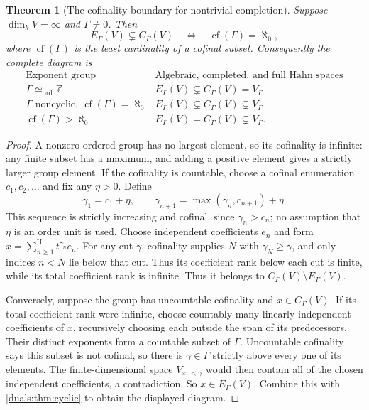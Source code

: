 \documentclass[11pt,letterpaper]{article}
\numberwithin{equation}{section}
\newtheorem{theorem}{Theorem}[section]
\theoremstyle{definition}
\theoremstyle{remark}
\newcommand{\Z}{\mathbb Z}
\newcommand{\sH}{\mathop{\sum}\nolimits^{\mathrm H}}
\begin{document}
\begin{theorem}[The cofinality boundary for nontrivial completion]
\label{duals:thm:cofinality-completion}
Suppose $\dim_kV=\infty$ and $\Gamma\ne0$. Then
\[
 E_\Gamma(V)\subsetneq C_\Gamma(V)
 \quad\Longleftrightarrow\quad \operatorname{cf}(\Gamma)=\aleph_0,
\]
where $\operatorname{cf}(\Gamma)$ is the least cardinality of a cofinal
subset. Consequently the complete diagram is
\[
 \begin{array}{c|c}
 \text{Exponent group}&\text{Algebraic, completed, and full Hahn spaces}\\ \hline
 \Gamma\simeq_{\mathrm{ord}}\Z&E_\Gamma(V)\subsetneq C_\Gamma(V)=V_\Gamma\\
 \Gamma\text{ noncyclic},\ \operatorname{cf}(\Gamma)=\aleph_0
 &E_\Gamma(V)\subsetneq C_\Gamma(V)\subsetneq V_\Gamma\\
 \operatorname{cf}(\Gamma)>\aleph_0&E_\Gamma(V)=C_\Gamma(V)\subsetneq V_\Gamma.
 \end{array}
\]
\end{theorem}
\begin{proof}
A nonzero ordered group has no largest element, so its cofinality is
infinite: any finite subset has a maximum, and adding a positive element
gives a strictly larger group element. If the cofinality is countable,
choose a cofinal enumeration $c_1,c_2,\ldots$ and fix any $\eta>0$.
Define
\[
 \gamma_1=c_1+\eta,\qquad
 \gamma_{n+1}=\max(\gamma_n,c_{n+1})+\eta.
\]
This sequence is strictly increasing and cofinal, since $\gamma_n>c_n$;
no assumption that $\eta$ is an order unit is used. Choose independent
coefficients $e_n$ and form $x=\sH_{n\ge1}t^{\gamma_n}e_n$.
For any cut $\gamma$, cofinality supplies $N$ with $\gamma_N\ge\gamma$,
and only indices $n<N$ lie below that cut. Thus its coefficient rank
below each cut is finite, while its total coefficient rank is infinite. Thus it belongs to
$C_\Gamma(V)\setminus E_\Gamma(V)$.

Conversely, suppose the group has uncountable cofinality and
$x\in C_\Gamma(V)$. If its total coefficient rank were infinite,
choose countably many linearly independent coefficients of $x$,
recursively choosing each outside the span of its predecessors.
Their distinct exponents form a countable subset of $\Gamma$.
Uncountable cofinality says this subset is not cofinal, so there is
$\gamma\in\Gamma$ strictly above every one of its elements.
The finite-dimensional space $V_{x,<\gamma}$ would then contain all
of the chosen independent coefficients, a contradiction. So $x\in E_\Gamma(V)$.
Combine this with \cref{duals:thm:cyclic} to obtain the displayed diagram.
\end{proof}
\end{document}
